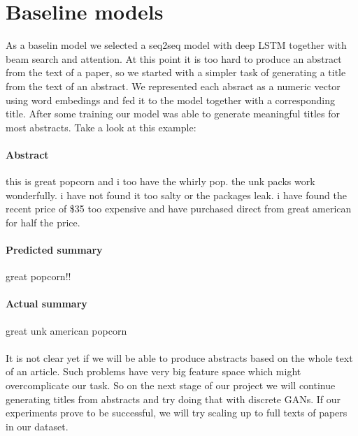 \documentclass[sigplan]{acmart}
\begin{document}
\section{Baseline models}

As a baselin model we selected a seq2seq model with deep LSTM\cite{sutskever-17} together with beam search and attention. At this point it is too hard to produce an abstract from the text of a paper, so we started with a simpler task of generating a title from the text of an abstract. We represented each absract as a numeric vector using word embedings and fed it to the model together with a corresponding title. After some training our model was able to generate meaningful titles for most abstracts. Take a look at this example:

\paragraph{Abstract} this is great popcorn and i too have the whirly pop. the unk packs work wonderfully. i have not found it too salty or the packages leak. i have found the recent price of \$35 too expensive and have purchased direct from great american for half the price.

\paragraph{Predicted summary} great popcorn!!

\paragraph{Actual summary} great unk american popcorn

\paragraph{} It is not clear yet if we will be able to produce abstracts based on the whole text of an article. Such problems have very big feature space which might overcomplicate our task. So on the next stage of our project we will continue generating titles from abstracts and try doing that with discrete GANs. If our experiments prove to be successful, we will try scaling up to full texts of papers in our dataset.

\end{document}
